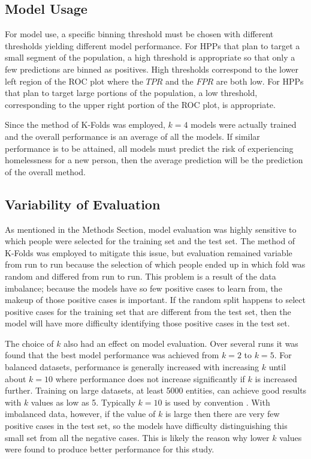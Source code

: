 \documentclass[10pt,letterpaper]{article}
\begin{document}
\subsection*{Model Usage}
For model use, a specific binning threshold must be chosen with different thresholds yielding different model performance. For HPPs that plan to target a small segment of the population, a high threshold is appropriate so that only a few predictions are binned as positives. High thresholds correspond to the lower left region of the ROC plot where the $TPR$ and the $FPR$ are both low. For HPPs that plan to target large portions of the population, a low threshold, corresponding to the upper right portion of the ROC plot, is appropriate. 

Since the method of K-Folds was employed, $k=4$ models were actually trained and the overall performance is an average of all the models. If similar performance is to be attained, all models must predict the risk of experiencing homelessness for a new person, then the average prediction will be the prediction of the overall method.

\subsection*{Variability of Evaluation}
As mentioned in the Methods Section, model evaluation was highly sensitive to which people were selected for the training set and the test set. The method of K-Folds was employed to mitigate this issue, but evaluation remained variable from run to run because the selection of which people ended up in which fold was random and differed from run to run. This problem is a result of the data imbalance; because the models have so few positive cases to learn from, the makeup of those positive cases is important. If the random split happens to select positive cases for the training set that are different from the test set, then the model will have more difficulty identifying those positive cases in the test set. 

The choice of $k$ also had an effect on model evaluation. Over several runs it was found that the best model performance was achieved from $k=2$ to $k=5$. For balanced datasets, performance is generally increased with increasing $k$ until about $k=10$ where performance does not increase significantly if $k$ is increased further. Training on large datasets, at least 5000 entities, can achieve good results with $k$ values as low as 5. Typically $k=10$ is used by convention \cite{marcot2020optimal}. With imbalanced data, however, if the value of $k$ is large then there are very few positive cases in the test set, so the models have difficulty distinguishing this small set from all the negative cases. This is likely the reason why lower $k$ values were found to produce better performance for this study.
\end{document}
